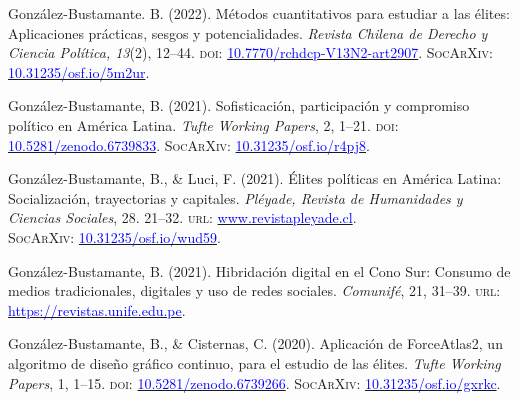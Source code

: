 
\begin{publications}

\begin{benumerate}{14}

\item{\small González-Bustamante. B. (2022). Métodos cuantitativos para estudiar a las élites: Aplicaciones prácticas, sesgos y potencialidades. {\itshape Revista Chilena de Derecho y Ciencia Política, 13}(2), 12--44. {\scshape doi:} \href{https://doi.org/10.7770/rchdcp-V13N2-art2907}{\textcolor{blue}{10.7770/rchdcp-V13N2-art2907}}. {\scshape \footnotesize SocArXiv:} \href{https://doi.org/10.31235/osf.io/5m2ur}{\textcolor{blue}{10.31235/osf.io/5m2ur}}.}\vspace{1mm}

\item{\small González-Bustamante, B. (2021). Sofisticación, participación y compromiso político en América Latina. {\itshape Tufte Working Papers}, 2, 1--21. {\scshape doi:} \href{https://doi.org/10.5281/zenodo.6739833}{\textcolor{blue}{10.5281/zenodo.6739833}}. {\scshape \footnotesize SocArXiv:} \href{https://doi.org/10.31235/osf.io/r4pj8}{\textcolor{blue}{10.31235/osf.io/r4pj8}}.}\vspace{1mm}

\item{\small González-Bustamante, B., \& Luci, F. (2021). Élites políticas en América Latina: Socialización, trayectorias y capitales. {\itshape Pléyade, Revista de Humanidades y Ciencias Sociales}, 28. 21--32. {\scshape url:} \href{http://www.revistapleyade.cl/index.php/OJS/article/view/359}{\textcolor{blue}{www.revistapleyade.cl}}. \\ {\scshape \footnotesize SocArXiv:} \href{https://doi.org/10.31235/osf.io/wud59}{\textcolor{blue}{10.31235/osf.io/wud59}}.}\vspace{1mm}

\item{\small González-Bustamante, B. (2021).  Hibridación digital en el Cono Sur: Consumo de medios tradicionales, digitales y uso de redes sociales. {\itshape Comunifé}, 21, 31--39. {\scshape url:} \href{https://revistas.unife.edu.pe/index.php/comunife/article/view/2580/}{\textcolor{blue}{https://revistas.unife.edu.pe}}.}\vspace{1mm}

\item{\small González-Bustamante, B., \& Cisternas, C. (2020). Aplicación de ForceAtlas2, un algoritmo de diseño gráfico continuo, para el estudio de las élites. {\itshape Tufte Working Papers}, 1, 1--15. {\scshape doi:} \href{https://doi.org/10.5281/zenodo.6739266}{\textcolor{blue}{10.5281/zenodo.6739266}}. {\scshape \footnotesize SocArXiv:} \href{https://doi.org/10.31235/osf.io/gxrkc}{\textcolor{blue}{10.31235/osf.io/gxrkc}}.}\vspace{1mm}


\end{benumerate}
\end{publications}
